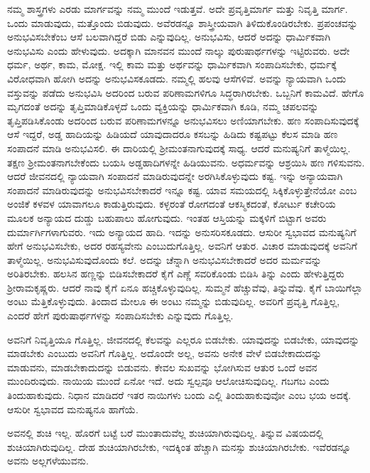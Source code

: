 ನಮ್ಮ ಶಾಸ್ತ್ರಗಳು ಎರಡು ಮಾರ್ಗವನ್ನು ನಮ್ಮ ಮುಂದೆ ಇಡುತ್ತವೆ. ಅದೇ ಪ್ರವೃತ್ತಿಮಾರ್ಗ ಮತ್ತು ನಿವೃತ್ತಿ ಮಾರ್ಗ. ಒಂದು ಮಾಡುವುದು, ಮತ್ತೊಂದು ಬಿಡುವುದು. ಅವೆರಡನ್ನೂ ಶಾಸ್ತ್ರೀಯವಾಗಿ ತಿಳಿದುಕೊಂಡಿರಬೇಕು. ಪ್ರಪಂಚವನ್ನು ಅನುಭವಿಸಬೇಕೆಂಬ ಆಸೆ ಬಲವಾಗಿದ್ದರೆ ಬಿಡು ಎನ್ನುವುದಿಲ್ಲ. ಅನುಭವಿಸು, ಆದರೆ ಅದನ್ನು ಧಾರ್ಮಿಕವಾಗಿ ಅನುಭವಿಸು ಎಂದು ಹೇಳುವುದು. ಅದಕ್ಕಾಗಿ ಮಾನವನ ಮುಂದೆ ನಾಲ್ಕು ಪುರುಷಾರ್ಥಗಳನ್ನು ಇಟ್ಟಿರುವರು. ಅದೇ ಧರ್ಮ, ಅರ್ಥ, ಕಾಮ, ಮೋಕ್ಷ. ಇಲ್ಲಿ ಕಾಮ ಮತ್ತು ಅರ್ಥವನ್ನು ಧಾರ್ಮಿಕವಾಗಿ ಸಂಪಾದಿಸಬೇಕು, ಧರ್ಮಕ್ಕೆ ವಿರೋಧವಾಗಿ ಹೋಗಿ ಅದನ್ನು ಅನುಭವಿಸಕೂಡದು. ನಮ್ಮಲ್ಲಿ ಹಲವು ಆಸೆಗಳಿವೆ. ಅವನ್ನು ನ್ಯಾಯವಾಗಿ ಒಂದು ವಸ್ತುವನ್ನು ಪಡೆದು ಅನುಭವಿಸಿ ಅದರಿಂದ ಬರುವ ಪರಿಣಾಮಗಳಿಗೂ ಸಿದ್ಧರಾಗಿರಬೇಕು. ಒಬ್ಬನಿಗೆ ಕಾಮವಿದೆ. ಹೇಗೊ ಮೃಗದಂತೆ ಅದನ್ನು ತೃಪ್ತಿಮಾಡಿಕೊಳ್ಳದೆ ಒಂದು ವ್ಯಕ್ತಿಯನ್ನು ಧಾರ್ಮಿಕವಾಗಿ ಕೂಡಿ, ನಮ್ಮ ಚಪಲವನ್ನು ತೃಪ್ತಿಪಡಿಸಿಕೊಂಡು ಅದರಿಂದ ಬರುವ ಪರಿಣಾಮಗಳನ್ನೂ ಅನುಭವಿಸಲು ಅಣಿಯಾಗಬೇಕು. ಹಣ ಸಂಪಾದಿಸುವುದಕ್ಕೆ ಆಸೆ ಇದ್ದರೆ, ಅಡ್ಡ ಹಾದಿಯನ್ನು ಹಿಡಿಯದೆ ಯಾವುದಾದರೂ ಕಸಬನ್ನು ಹಿಡಿದು ಕಷ್ಟಪಟ್ಟು ಕೆಲಸ ಮಾಡಿ ಹಣ ಸಂಪಾದನೆ ಮಾಡಿ ಅನುಭವಿಸಲಿ. ಈ ದಾರಿಯಲ್ಲಿ ಶ‍್ರೀಮಂತನಾಗುವುದಕ್ಕೆ ಸಾಧ್ಯ. ಆದರೆ ಮನುಷ್ಯನಿಗೆ ತಾಳ್ಮೆಯಿಲ್ಲ. ತಕ್ಷಣ ಶ‍್ರೀಮಂತನಾಗಬೇಕೆಂದು ಬಯಸಿ ಅಡ್ಡಹಾದಿಗಳನ್ನೇ ಹಿಡಿಯುವನು. ಅಧರ್ಮವನ್ನು ಆಶ್ರಯಿಸಿ ಹಣ ಗಳಿಸುವನು. ಆದರೆ ಜೀವನದಲ್ಲಿ ನ್ಯಾಯವಾಗಿ ಸಂಪಾದನೆ ಮಾಡಿರುವುದನ್ನೇ ಅರಗಿಸಿ\-ಕೊಳ್ಳುವುದು ಕಷ್ಟ. ಇನ್ನು ಅನ್ಯಾಯವಾಗಿ ಸಂಪಾದನೆ ಮಾಡಿರುವುದನ್ನು ಅನುಭವಿಸಬೇಕಾದರೆ ಇನ್ನೂ ಕಷ್ಟ. ಯಾವ ಸಮಯದಲ್ಲಿ ಸಿಕ್ಕಿಕೊಳ್ಳುತ್ತೇನೆಯೋ ಎಂಬ ಅಂಜಿಕೆ ಕಳವಳ ಯಾವಾಗಲೂ ಕಾಡುತ್ತಿರುವುದು. ಕಳ್ಳರಂತೆ ರೋಗದಂತೆ ಆಕಸ್ಮಿಕದಂತೆ, ಕೋರ್ಟು ಕಚೇರಿಯ ಮೂಲಕ ಅನ್ಯಾಯದ ದುಡ್ಡು ಬಹುಪಾಲು ಹೋಗುವುದು. ಇಂತಹ ಆಸ್ತಿಯನ್ನು ಮಕ್ಕಳಿಗೆ ಬಿಟ್ಟಾಗ ಅವರು ದುರ್ಮಾರ್ಗಿಗಳಾಗುವರು. ಇದು ಅನ್ಯಾಯದ ಹಾದಿ. ಇದನ್ನು ಅನುಸರಿಸಕೂಡದು. ಆಸುರೀ ಸ್ವಭಾವದ ಮನುಷ್ಯನಿಗೆ ಹೇಗೆ ಅನುಭವಿಸಬೇಕು, ಅದರ ರಹಸ್ಯವೇನು ಎಂಬುದು\break ಗೊತ್ತಿಲ್ಲ. ಅವನಿಗೆ ಆತುರ. ವಿಚಾರ ಮಾಡುವುದಕ್ಕೆ ಅವನಿಗೆ ತಾಳ್ಮೆಯಿಲ್ಲ. ಅನುಭವಿಸುವು\-ದೊಂದು ಕಲೆ. ಅದನ್ನು ಚೆನ್ನಾಗಿ ಅನುಭವಿಸಬೇಕಾದರೆ ಅದರ ಮರ್ಮವನ್ನು ಅರಿತಿರಬೇಕು. ಹಲಸಿನ ಹಣ್ಣನ್ನು ಬಿಡಿಸಬೇಕಾದರೆ ಕೈಗೆ ಎಣ್ಣೆ ಸವರಿಕೊಂಡು ಬಿಡಿಸಿ ತಿನ್ನು ಎಂದು ಹೇಳುತ್ತಿದ್ದರು ಶ‍್ರೀರಾಮಕೃಷ್ಣರು. ಆದರೆ ನಾವು ಕೈಗೆ ಏನೂ ಹಚ್ಚಿಕೊಳ್ಳುವುದಿಲ್ಲ. ಸುಮ್ಮನೆ ಹೆಚ್ಚುವೆವು, ತಿನ್ನುವೆವು. ಕೈಗೆ ಬಾಯಿಗೆಲ್ಲಾ ಅಂಟು ಮೆತ್ತಿಕೊಳ್ಳುವುದು. ತಿಂದಾದ ಮೇಲೂ ಈ ಅಂಟು ನಮ್ಮನ್ನು ಬಿಡುವುದಿಲ್ಲ. ಅವರಿಗೆ ಪ್ರವೃತ್ತಿ ಗೊತ್ತಿಲ್ಲ, ಎಂದರೆ ಹೇಗೆ ಪುರುಷಾರ್ಥಗಳನ್ನು ಸಂಪಾದಿಸಬೇಕು ಎನ್ನುವುದು ಗೊತ್ತಿಲ್ಲ.

ಅವನಿಗೆ ನಿವೃತ್ತಿಯೂ ಗೊತ್ತಿಲ್ಲ. ಜೀವನದಲ್ಲಿ ಕೆಲವನ್ನು ಎಲ್ಲರೂ ಬಿಡಬೇಕು. ಯಾವುದನ್ನು ಬಿಡಬೇಕು, ಯಾವುದನ್ನು ಮಾಡಬೇಕು ಎಂಬುದು ಅವನಿಗೆ ಗೊತ್ತಿಲ್ಲ. ಅದೊಂದೇ ಅಲ್ಲ, ಅವನು ಅನೇಕ ವೇಳೆ ಬಿಡಬೇಕಾದುದನ್ನು ಮಾಡುವನು, ಮಾಡಬೇಕಾದುದನ್ನು ಬಿಡುವನು. ಕೇವಲ ಸುಖವನ್ನು ಭೋಗಿಸುವ ಆತುರ ಒಂದೆ ಅವನ ಮುಂದಿರುವುದು. ನಾಯಿಯ ಮುಂದೆ ಏನೋ ಇದೆ. ಅದು ಸ್ವಲ್ಪವೂ ಆಲೋಚಿಸುವುದಿಲ್ಲ. ಗಬಗಬ ಎಂದು ತಿಂದುಹಾಕುವುದು. ನಿಧಾನ ಮಾಡಿದರೆ ಇತರ ನಾಯಿಗಳು ಬಂದು ಎಲ್ಲಿ ತಿಂದುಹಾಕುವುವೋ ಎಂಬ ಭಯ ಅದಕ್ಕೆ. ಆಸುರೀ ಸ್ವಭಾವದ ಮನುಷ್ಯನೂ ಹಾಗೆಯೆ.

ಅವನಲ್ಲಿ ಶುಚಿ ಇಲ್ಲ. ಹೊರಗೆ ಬಟ್ಟೆ ಬರೆ ಮುಂತಾದುವೆಲ್ಲ ಶುಚಿಯಾಗಿರುವುದಿಲ್ಲ. ತಿನ್ನುವ ವಿಷಯದಲ್ಲಿ ಶುಚಿಯಾಗಿರುವುದಿಲ್ಲ. ದೇಹ ಶುಚಿಯಾಗಿರಬೇಕು, ಇದಕ್ಕಿಂತ ಹೆಚ್ಚಾಗಿ ಮನಸ್ಸು ಶುಚಿಯಾಗಿರಬೇಕು. ಇವೆರಡನ್ನೂ ಅವನು ಅಲ್ಲಗಳೆಯುವನು.

